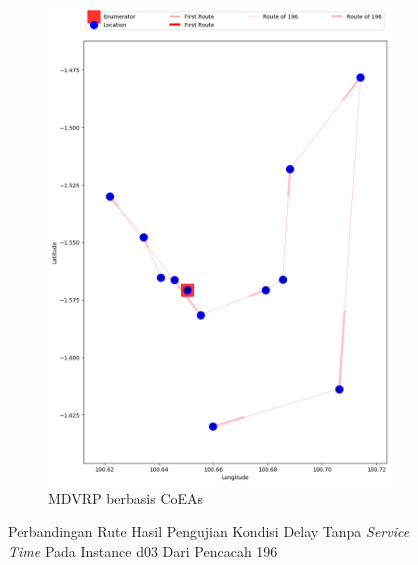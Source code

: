 \begin{figure}[H]
	\centering
	\begin{subfigure}[t]{\textwidth}
		\centering
		\includegraphics[width=\textwidth]{Resources/Images/delayed_3/real_m15_n100_delayed_3_196_coes}
		\caption{MDVRP berbasis CoEAs}
		\label{fig:real_m15_n100_delayed_3_196_coes}
	\end{subfigure}
	\caption{Perbandingan Rute Hasil Pengujian Kondisi Delay Tanpa \textit{Service Time} Pada Instance d03 Dari Pencacah 196}
	\label{fig:real_m15_n100_delayed_3_196}
\end{figure}


